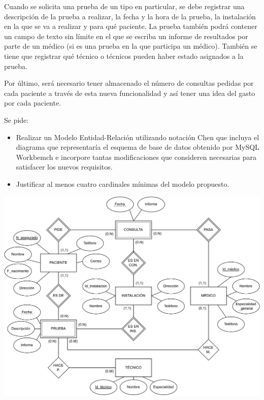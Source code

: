\documentclass[12pt,a4paper,addpoints,answers]{exam}
\begin{document}
\begin{questions}
Cuando se solicita una prueba de un tipo en particular, se debe registrar una descripción de la prueba a realizar, la fecha y la hora de la prueba, la instalación en la que se va a realizar y para qué paciente. La prueba también podrá contener un campo de texto sin límite en el que se escriba un informe de resultados por parte de un médico (si es una prueba en la que participa un médico). También se tiene que registrar qué técnico o técnicos pueden haber estado asignados a la prueba. 

Por último, será necesario tener almacenado el número de consultas pedidas por cada paciente a través de esta nueva funcionalidad y así tener una idea del gasto por cada paciente.

Se pide: 

\begin{itemize}
    \item Realizar un Modelo Entidad-Relación utilizando notación Chen que incluya el diagrama que representaría el esquema de base de datos obtenido por MySQL Workbemch e incorpore tantas modificaciones que consideren necesarias para satisfacer los nuevos requisitos.
    \item Justificar al menos cuatro cardinales mínimas del modelo propuesto.
\end{itemize}

\begin{solution}
    \includegraphics[width=\textwidth]{figs/bbdd-2023-2024-ordinaria/mer-solucion.pdf}


\end{solution}
\end{questions}
\end{document}
